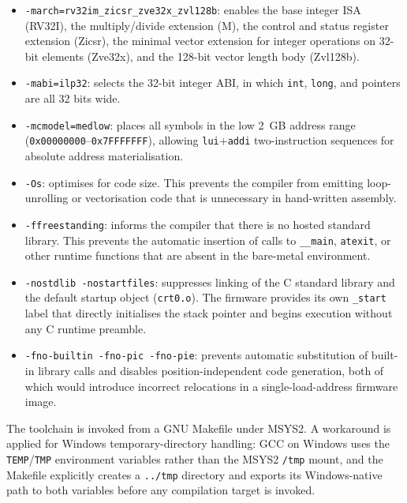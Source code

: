 \begin{itemize}
  \item \texttt{-march=rv32im\_zicsr\_zve32x\_zvl128b}: enables the base integer ISA
        (RV32I), the multiply/divide extension (M), the control and status register
        extension (Zicsr), the minimal vector extension for integer operations on 32-bit
        elements (Zve32x), and the 128-bit vector length body (Zvl128b).
  \item \texttt{-mabi=ilp32}: selects the 32-bit integer ABI, in which \texttt{int},
        \texttt{long}, and pointers are all 32 bits wide.
  \item \texttt{-mcmodel=medlow}: places all symbols in the low 2~GB address range
        (\texttt{0x00000000}–\texttt{0x7FFFFFFF}), allowing \texttt{lui}+\texttt{addi}
        two-instruction sequences for absolute address materialisation.
  \item \texttt{-Os}: optimises for code size. This prevents the compiler from emitting
        loop-unrolling or vectorisation code that is unnecessary in hand-written assembly.
  \item \texttt{-ffreestanding}: informs the compiler that there is no hosted standard
        library. This prevents the automatic insertion of calls to \texttt{\_\_main},
        \texttt{atexit}, or other runtime functions that are absent in the bare-metal
        environment.
  \item \texttt{-nostdlib -nostartfiles}: suppresses linking of the C standard library
        and the default startup object (\texttt{crt0.o}). The firmware provides its own
        \texttt{\_start} label that directly initialises the stack pointer and begins
        execution without any C runtime preamble.
  \item \texttt{-fno-builtin -fno-pic -fno-pie}: prevents automatic substitution of
        built-in library calls and disables position-independent code generation,
        both of which would introduce incorrect relocations in a single-load-address
        firmware image.
\end{itemize}

The toolchain is invoked from a GNU Makefile under MSYS2. A workaround is applied for
Windows temporary-directory handling: GCC on Windows uses the \texttt{TEMP}/\texttt{TMP}
environment variables rather than the MSYS2 \texttt{/tmp} mount, and the Makefile
explicitly creates a \texttt{../tmp} directory and exports its Windows-native path to
both variables before any compilation target is invoked.

